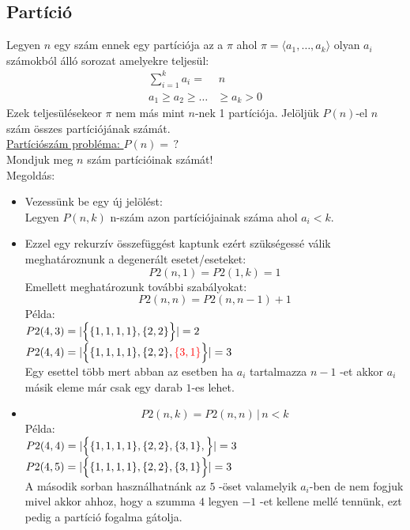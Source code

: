 \documentclass{article}
\theoremstyle{mytheoremstyle}
\theoremstyle{mytheoremstyle}
\theoremstyle{myproblemstyle}
\begin{document}
\subsection{Partíció}
Legyen $n$ egy szám ennek egy partíciója az a $\pi$ ahol
$\pi = \langle a_1,\ldots,a_k\rangle$ olyan $a_i$ számokból álló
sorozat amelyekre teljesül:
\begin{align*}
    \sum_{i=1}^{k}a_i=&\,n\\
    a_1\geq a_2\geq\ldots&\geq a_k >0
\end{align*}
Ezek teljesülésekeor $\pi$ nem más mint $n$-nek 1 partíciója. 
Jelöljük $P(n)$-el $n$ szám összes partíciójának számát.\\
\underline{Partíciószám probléma: $P(n)=\,?$}\\
Mondjuk meg $n$ szám partícióinak számát!\\
Megoldás:\\
\begin{itemize}
    \item
Vezessünk be egy új jelölést: \\
Legyen $P(n,k)$ n-szám azon partíciójainak száma ahol $a_i<k$.\\
\item
Ezzel egy rekurzív összefüggést kaptunk ezért szükségessé válik
meghatároznunk a degenerált esetet/eseteket:
$$ P2(n,1) = P2(1,k) = 1 $$
Emellett meghatározunk további szabályokat:\\
$$P2(n,n) = P2(n,n-1) + 1$$
Példa:\\
$P2(4,3) = |\Bigl\{\{1,1,1,1\},\{2,2\}\Bigr\}|=2$\\ 
$P2(4,4) = |\Bigl\{\{1,1,1,1\},\{2,2\},\color{red}\{3,1\}
\color{black}\Bigr\}|=3$\\
Egy esettel több mert abban az esetben ha
\color{red}$a_i$ \color{black} 
tartalmazza $n-1$ -et akkor \color{red}$a_i$ \color{black}
másik eleme már csak egy darab $1$-es lehet.
\item 
$$P2(n,k) = P2(n,n)\,|\,n<k$$
Példa:\\
$P2(4,4) = |\Bigl\{\{1,1,1,1\},\{2,2\},\{3,1\},\Bigr\}|=3$\\
$P2(4,5) = |\Bigl\{\{1,1,1,1\},\{2,2\},\{3,1\}\Bigr\}|=3$\\
A második sorban használhatnánk az $5$ -öset valamelyik 
$a_i$-ben de nem fogjuk mivel akkor ahhoz, hogy a szumma $4$
legyen $-1$ -et kellene mellé tennünk, ezt pedig a 
partíció fogalma gátolja.

\end{itemize}
\end{document}

